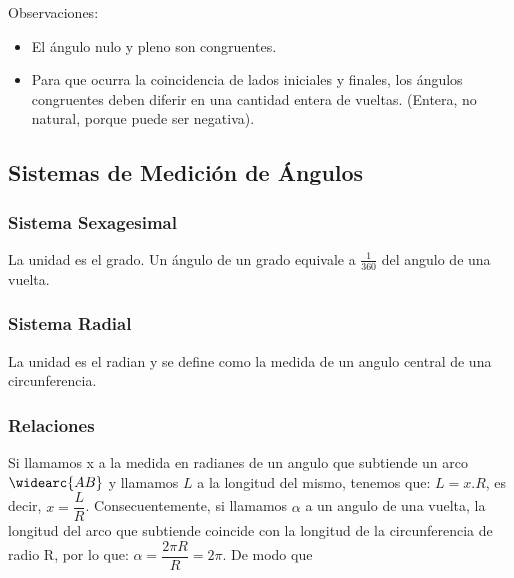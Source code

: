 \documentclass[10pt]{article}
\begin{document}
Observaciones:
\begin{itemize}
\item El ángulo nulo y pleno son congruentes.
\item Para que ocurra la coincidencia de lados iniciales y finales, los ángulos congruentes deben diferir en una cantidad entera de vueltas. (Entera, no natural, porque puede ser negativa).
\end{itemize}

\subsection{Sistemas de Medición de Ángulos}
\subsubsection{Sistema Sexagesimal}
La unidad es el grado. Un ángulo de un grado equivale a $\frac{1}{360}$ del angulo de una vuelta.
\subsubsection{Sistema Radial}
La unidad es el radian y se define como la medida de un angulo central de una circunferencia.
\subsubsection{Relaciones}
Si llamamos x a la medida en radianes de un angulo que subtiende un arco $\widearc{AB}$ y llamamos $L$ a la longitud del mismo, tenemos que: $L = x.R$, es decir, $x=\dfrac{L}{R}$. Consecuentemente, si llamamos $\alpha$ a un angulo de una vuelta, la longitud del arco que subtiende coincide con la longitud de la circunferencia de radio R, por lo que: $\alpha = \dfrac{2 \pi R}{R} = 2 \pi$. De modo que 
\newpage
\end{document}
